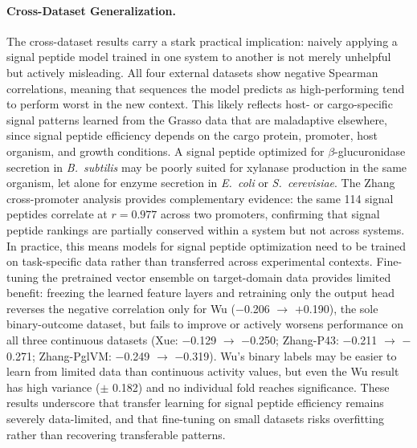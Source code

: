 \documentclass[12pt]{article}
\begin{document}
\paragraph{Cross-Dataset Generalization.}
The cross-dataset results carry a stark practical implication: naively applying a signal peptide model trained in one system to another is not merely unhelpful but actively misleading.
All four external datasets show negative Spearman correlations, meaning that sequences the model predicts as high-performing tend to perform worst in the new context.
This likely reflects host- or cargo-specific signal patterns learned from the Grasso data that are maladaptive elsewhere, since signal peptide efficiency depends on the cargo protein, promoter, host organism, and growth conditions.
A signal peptide optimized for $\beta$-glucuronidase secretion in \textit{B.\ subtilis} may be poorly suited for xylanase production in the same organism, let alone for enzyme secretion in \textit{E.\ coli} or \textit{S.\ cerevisiae}.
The Zhang cross-promoter analysis provides complementary evidence: the same 114 signal peptides correlate at $r = 0.977$ across two promoters, confirming that signal peptide rankings are partially conserved within a system but not across systems.
In practice, this means models for signal peptide optimization need to be trained on task-specific data rather than transferred across experimental contexts.
Fine-tuning the pretrained vector ensemble on target-domain data provides limited benefit:
freezing the learned feature layers and retraining only the output head reverses
the negative correlation only for Wu ($-$0.206 $\to$ $+$0.190), the sole binary-outcome dataset,
but fails to improve or actively worsens performance on all three continuous datasets
(Xue: $-$0.129 $\to$ $-$0.250; Zhang-P43: $-$0.211 $\to$ $-$0.271; Zhang-PglVM: $-$0.249 $\to$ $-$0.319).
Wu's binary labels may be easier to learn from limited data than continuous activity values,
but even the Wu result has high variance ($\pm$ 0.182) and no individual fold reaches significance.
These results underscore that transfer learning for signal peptide efficiency remains
severely data-limited, and that fine-tuning on small datasets risks overfitting rather than recovering
transferable patterns.
\end{document}
